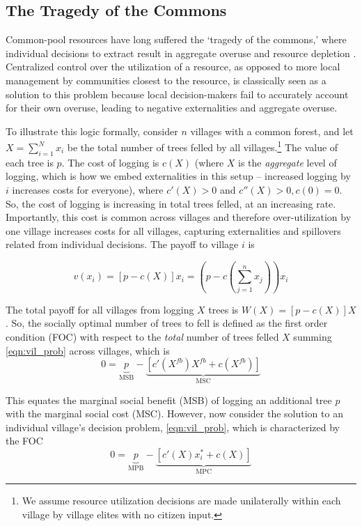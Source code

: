 \documentclass[12pt,reqno]{article}
\newcommand{\Ubr}[2]{\underbrace{#1}_{\text{#2}}}
\begin{document}
\subsection{The Tragedy of the Commons}\label{sub:toc_mod}

Common-pool resources have long suffered the `tragedy of the commons,' where individual decisions to extract result in aggregate overuse and resource depletion \parencite{hardin1968tragedy}. Centralized control over the utilization of a resource, as opposed to more local management by communities closest to the resource, is classically seen as a solution to this problem because local decision-makers fail to accurately account for their own overuse, leading to negative externalities and aggregate overuse. 

To illustrate this logic formally, consider $n$ villages with a common forest, and let $X = \sum_{i=1}^N x_i$ be the total number of trees felled by all villages.\footnote{We assume resource utilization decisions are made unilaterally within each village by village elites with no citizen input.} The value of each tree is $p$. The cost of logging is $c(X)$ (where $X$ is the \emph{aggregate} level of logging, which is how we embed externalities in this setup -- increased logging by $i$ increases costs for everyone), where $c'(X) > 0$ and $c''(X) > 0, c(0) = 0$. So, the cost of logging is increasing in total trees felled, at an increasing rate. Importantly, this cost is common across villages and therefore over-utilization by one village increases costs for all villages, capturing externalities and spillovers related from individual decisions.  The payoff to village $i$ is

\begin{equation}
 v(x_i) = [p - c(X)] x_i = \left(p -  c \left( \sum_{j=1}^n x_j\right)\right) x_i \label{eqn:vil_prob}
\end{equation}

The total payoff for all villages from logging $X$ trees is  $W(X) = [p - c(X)]X$. So, the socially optimal number of trees to fell is defined as the first order condition (FOC) with respect to the \emph{total} number of trees felled $X$ summing \ref{eqn:vil_prob} across villages, which is
\begin{equation}
 0 = \Ubr{p}{MSB} - \Ubr{[c'(X^{fb}) X^{fb} + c(X^{fb})]}{MSC} \label{eqn:soc_opt}
\end{equation}

This equates the marginal social benefit (MSB) of logging an additional tree $p$ with the marginal social cost (MSC). However, now consider the solution to an individual village's decision problem, \ref{eqn:vil_prob}, which is characterized by the FOC
\begin{equation}
0 = \Ubr{p}{MPB} - \Ubr{[c'(X) x_i^* + c(X)]}{MPC} \label{eqn:eqn_foc}
\end{equation}
\end{document}
